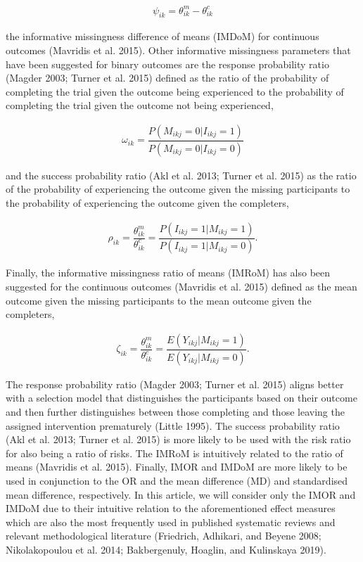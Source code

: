 \[\begin{aligned}
\psi_{ik} = \theta^{m}_{ik} - \theta^{c}_{ik}
\end{aligned}\]

the informative missingness difference of means (IMDoM) for continuous outcomes
(Mavridis et al. 2015). Other informative missingness parameters that have been suggested
for binary outcomes are the response probability ratio (Magder 2003; Turner et al. 2015)
defined as the ratio of the probability of completing the trial given the outcome
being experienced to the probability of completing the trial given the outcome
not being experienced,

\[\begin{aligned}
\omega_{ik} = \dfrac{P(M_{ikj} = 0 | I_{ikj} = 1)}{P(M_{ikj} = 0 | I_{ikj} = 0)}
\end{aligned}\]

and the success probability ratio (Akl et al. 2013; Turner et al. 2015) as the ratio of the
probability of experiencing the outcome given the missing participants to the
probability of experiencing the outcome given the completers,

\[\begin{aligned}
\rho_{ik} = \dfrac{\theta^{m}_{ik}}{\theta^{c}_{ik}} = \dfrac{P(I_{ikj} = 1 | M_{ikj} = 1)}{P(I_{ikj} = 1 | M_{ikj} = 0)}.
\end{aligned}\]

Finally, the informative missingness ratio of means (IMRoM) has also been suggested
for the continuous outcomes (Mavridis et al. 2015) defined as the mean outcome given the
missing participants to the mean outcome given the completers,

\[\begin{aligned}
\zeta_{ik} = \dfrac{\theta^{m}_{ik}}{\theta^{c}_{ik}} = \dfrac{E(Y_{ikj} | M_{ikj} = 1)}{E(Y_{ikj} | M_{ikj} = 0)}.
\end{aligned}\]

The response probability ratio (Magder 2003; Turner et al. 2015) aligns better with a
selection model that distinguishes the participants based on their outcome and
then further distinguishes between those completing and those leaving the assigned
intervention prematurely (Little 1995). The success probability ratio (Akl et al. 2013; Turner et al. 2015) is more likely to be used with the risk ratio for also being a ratio
of risks. The IMRoM is intuitively related to the ratio of means (Mavridis et al. 2015).
Finally, IMOR and IMDoM are more likely to be used in conjunction to the OR and
the mean difference (MD) and standardised mean difference, respectively. In this
article, we will consider only the IMOR and IMDoM due to their intuitive relation
to the aforementioned effect measures which are also the most frequently used in
published systematic reviews and relevant methodological literature (Friedrich, Adhikari, and Beyene 2008; Nikolakopoulou et al. 2014; Bakbergenuly, Hoaglin, and Kulinskaya 2019).

